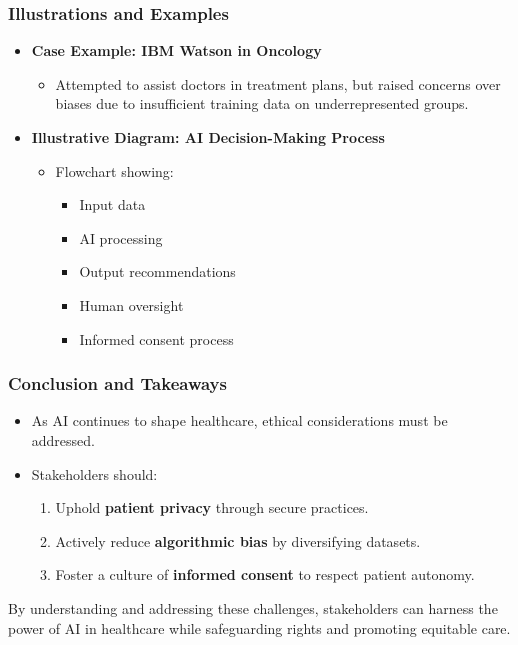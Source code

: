 \documentclass[aspectratio=169]{beamer}
\begin{document}
\begin{frame}[fragile]
    \frametitle{Illustrations and Examples}
    \begin{itemize}
        \item \textbf{Case Example: IBM Watson in Oncology}
        \begin{itemize}
            \item Attempted to assist doctors in treatment plans, but raised concerns over biases due to insufficient training data on underrepresented groups.
        \end{itemize}
        
        \item \textbf{Illustrative Diagram: AI Decision-Making Process}
        \begin{itemize}
            \item Flowchart showing:
            \begin{itemize}
                \item Input data
                \item AI processing
                \item Output recommendations
                \item Human oversight
                \item Informed consent process
            \end{itemize}
        \end{itemize}
    \end{itemize}
\end{frame}

\begin{frame}[fragile]
    \frametitle{Conclusion and Takeaways}
    \begin{itemize}
        \item As AI continues to shape healthcare, ethical considerations must be addressed.
        \item Stakeholders should:
        \begin{enumerate}
            \item Uphold \textbf{patient privacy} through secure practices.
            \item Actively reduce \textbf{algorithmic bias} by diversifying datasets.
            \item Foster a culture of \textbf{informed consent} to respect patient autonomy.
        \end{enumerate}
    \end{itemize}
    By understanding and addressing these challenges, stakeholders can harness the power of AI in healthcare while safeguarding rights and promoting equitable care.
\end{frame}
\end{document}
